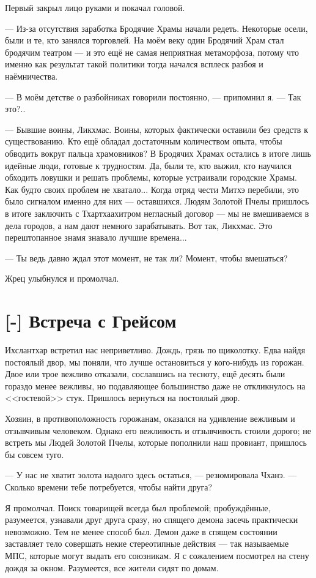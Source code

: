 Первый закрыл лицо руками и покачал головой.

--- Из-за отсутствия заработка Бродячие Храмы начали редеть.
Некоторые осели, были и те, кто занялся торговлей.
На моём веку один Бродячий Храм стал бродячим театром --- и это ещё не самая неприятная метаморфоза, потому что именно как результат такой политики тогда начался всплеск разбоя и наёмничества.

--- В моём детстве о разбойниках говорили постоянно, --- припомнил я.
--- Так это?..

--- Бывшие воины, Ликхмас.
Воины, которых фактически оставили без средств к существованию.
Кто ещё обладал достаточным количеством опыта, чтобы обводить вокруг пальца храмовников?
В Бродячих Храмах остались в итоге лишь идейные люди, готовые к трудностям.
Да, были те, кто выжил, кто научился обходить ловушки и решать проблемы, которые устраивали городские Храмы.
Как будто своих проблем не хватало...
Когда отряд чести Митхэ перебили, это было сигналом именно для них --- оставшихся.
Людям Золотой Пчелы пришлось в итоге заключить с Тхартхаахитром негласный договор --- мы не вмешиваемся в дела городов, а нам дают немного зарабатывать.
Вот так, Ликхмас.
Это перештопанное знамя знавало лучшие времена...

--- Ты ведь давно ждал этот момент, не так ли?
Момент, чтобы вмешаться?

Жрец улыбнулся и промолчал.

\section{[-] Встреча с Грейсом}

Ихслантхар встретил нас неприветливо.
Дождь, грязь по щиколотку.
Едва найдя постоялый двор, мы поняли, что лучше остановиться у кого-нибудь из горожан.
Двое или трое вежливо отказали, сославшись на тесноту, ещё десять были гораздо менее вежливы, но подавляющее большинство даже не откликнулось на <<гостевой>> стук.
Пришлось вернуться на постоялый двор.

Хозяин, в противоположность горожанам, оказался на удивление вежливым и отзывчивым человеком.
Однако его вежливость и отзывчивость стоили дорого;
не встреть мы Людей Золотой Пчелы, которые пополнили наш провиант, пришлось бы совсем туго.

--- У нас не хватит золота надолго здесь остаться, --- резюмировала Чханэ.
--- Сколько времени тебе потребуется, чтобы найти друга?

Я промолчал.
Поиск товарищей всегда был проблемой;
пробуждённые, разумеется, узнавали друг друга сразу, но спящего демона засечь практически невозможно.
Тем не менее способ был.
Демон даже в спящем состоянии заставляет тело совершать некие стереотипные действия --- так называемые МПС\FM, которые могут выдать его союзникам.
Я с сожалением посмотрел на стену дождя за окном.
Разумеется, все жители сидят по домам.

